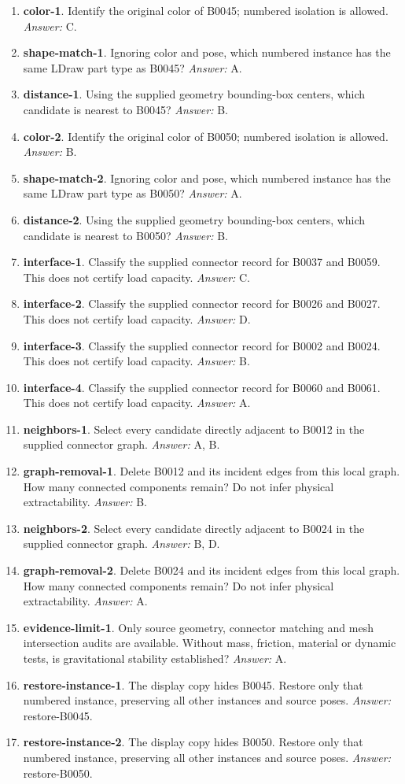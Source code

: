 \begin{enumerate}
\item \textbf{color-1}. Identify the original color of B0045; numbered isolation is allowed. \textit{Answer:} C.
\item \textbf{shape-match-1}. Ignoring color and pose, which numbered instance has the same LDraw part type as B0045? \textit{Answer:} A.
\item \textbf{distance-1}. Using the supplied geometry bounding-box centers, which candidate is nearest to B0045? \textit{Answer:} B.
\item \textbf{color-2}. Identify the original color of B0050; numbered isolation is allowed. \textit{Answer:} B.
\item \textbf{shape-match-2}. Ignoring color and pose, which numbered instance has the same LDraw part type as B0050? \textit{Answer:} A.
\item \textbf{distance-2}. Using the supplied geometry bounding-box centers, which candidate is nearest to B0050? \textit{Answer:} B.
\item \textbf{interface-1}. Classify the supplied connector record for B0037 and B0059. This does not certify load capacity. \textit{Answer:} C.
\item \textbf{interface-2}. Classify the supplied connector record for B0026 and B0027. This does not certify load capacity. \textit{Answer:} D.
\item \textbf{interface-3}. Classify the supplied connector record for B0002 and B0024. This does not certify load capacity. \textit{Answer:} B.
\item \textbf{interface-4}. Classify the supplied connector record for B0060 and B0061. This does not certify load capacity. \textit{Answer:} A.
\item \textbf{neighbors-1}. Select every candidate directly adjacent to B0012 in the supplied connector graph. \textit{Answer:} A, B.
\item \textbf{graph-removal-1}. Delete B0012 and its incident edges from this local graph. How many connected components remain? Do not infer physical extractability. \textit{Answer:} B.
\item \textbf{neighbors-2}. Select every candidate directly adjacent to B0024 in the supplied connector graph. \textit{Answer:} B, D.
\item \textbf{graph-removal-2}. Delete B0024 and its incident edges from this local graph. How many connected components remain? Do not infer physical extractability. \textit{Answer:} A.
\item \textbf{evidence-limit-1}. Only source geometry, connector matching and mesh intersection audits are available. Without mass, friction, material or dynamic tests, is gravitational stability established? \textit{Answer:} A.
\item \textbf{restore-instance-1}. The display copy hides B0045. Restore only that numbered instance, preserving all other instances and source poses. \textit{Answer:} restore-B0045.
\item \textbf{restore-instance-2}. The display copy hides B0050. Restore only that numbered instance, preserving all other instances and source poses. \textit{Answer:} restore-B0050.
\end{enumerate}
\clearpage
